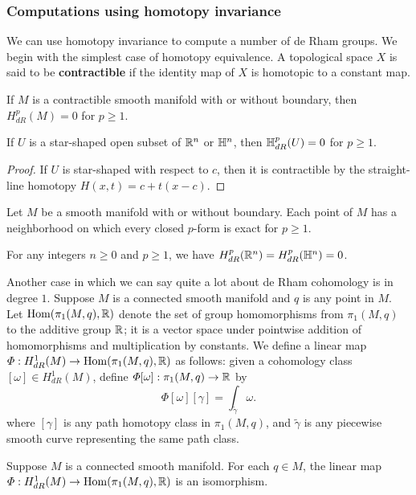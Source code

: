 \subsubsection{Computations using homotopy invariance}
We can use homotopy invariance to compute a number of de Rham groups. We begin with the simplest case of homotopy equivalence. A topological space $X$ is said to
be \textbf{contractible} if the identity map of $X$ is homotopic to a constant map.
\begin{theorem}
If $M$ is a contractible smooth manifold with or without boundary, then $H^p_{dR}(M)=0$ for $p\geq 1$.
\end{theorem}
\begin{theorem}
If $U$ is a star-shaped open subset of $\mathbb{R}^n$ or $\mathbb{H}^n$, then $\mathbb{H}^p_{dR}(U)=0$ for $p\geq1$.
\end{theorem}
\begin{proof}
If $U$ is star-shaped with respect to $c$, then it is contractible by the straight-line homotopy $H(x,t)=c+t(x-c)$.
\end{proof}
\begin{corollary}
Let $M$ be a smooth manifold with or without boundary. Each point of $M$ has a neighborhood on which every closed $p$-form is exact for $p\geq 1$.
\end{corollary}
\begin{corollary}
For any integers $n\geq 0$ and $p\geq1$, we have $H^p_{dR}(\mathbb{R}^n)=H^p_{dR}(\mathbb{H}^n)=0$.
\end{corollary}
Another case in which we can say quite a lot about de Rham cohomology is in degree $1$. Suppose $M$ is a connected smooth manifold and $q$ is any point in $M$. Let $\mathrm{Hom}(\pi_1(M,q),\mathbb{R})$ denote the set of group homomorphisms from $\pi_1(M,q)$ to the additive group $\mathbb{R}$; it is a vector space under pointwise addition of homomorphisms and multiplication by constants. We define a linear map $\varPhi:H^1_{dR}(M)\to\mathrm{Hom}(\pi_1(M,q),\mathbb{R})$ as follows: given a cohomology class $[\omega]\in H^1_{dR}(M)$, define $\varPhi[\omega]:\pi_1(M,q)\to\mathbb{R}$ by
\[\varPhi[\omega][\gamma]=\int_{\widetilde{\gamma}}\omega.\]
where $[\gamma]$ is any path homotopy class in $\pi_1(M,q)$, and $\widetilde{\gamma}$ is any piecewise smooth curve representing the same path class.
\begin{theorem}\label{cohomology fundamental group}
Suppose $M$ is a connected smooth manifold. For each $q\in M$, the linear map $\varPhi:H^1_{dR}(M)\to\mathrm{Hom}(\pi_1(M,q),\mathbb{R})$ is an isomorphism.
\end{theorem}
